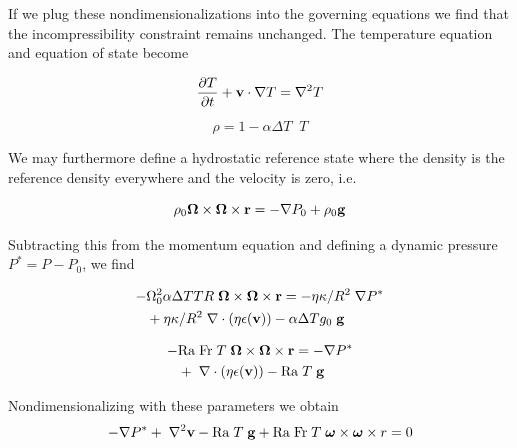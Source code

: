 \documentclass[extra,mreferee]{gji}
\begin{document}
If we plug these nondimensionalizations into the governing equations we find that the incompressibility constraint remains unchanged.  The temperature equation and equation of state become

\begin{equation}
\frac{\partial T}{\partial t} + {\bf v} \cdot \nabla T = \nabla^2 T
\end{equation}

\begin{equation}
\rho = 1 - \alpha \Delta T \;\;  T
\end{equation}

We may furthermore define a hydrostatic reference state where the density is the reference density everywhere and the velocity is zero, i.e.

\begin{equation}
 \rho_0{\bf \Omega \times \Omega \times r}= - \nabla P_0 + \rho_0 {\bf g}
\end{equation}

Subtracting this from the momentum equation and defining a dynamic pressure $P^* = P - P_0$, we find

\begin{equation}
\begin{aligned}
 - & \Omega_0^2  \alpha  \Delta T T R \; {\bf \Omega \times \Omega \times r} = - \eta \kappa / R^2 \; \nabla P^* \\ 
&+ \eta \kappa / R^2 \; \nabla \cdot \left( \eta \epsilon ({\bf v}) \right) - \alpha \Delta T g_0 \; {\bf g}
\end{aligned}
\end{equation}

\begin{equation}
\begin{aligned}
 - & \mathrm{Ra \; Fr}\; T \; {\bf \Omega \times \Omega \times r} = - \nabla P^* \\ 
&+ \; \nabla \cdot \left( \eta \epsilon ({\bf v}) \right) - \mathrm{Ra} \; T \; {\bf g}
\end{aligned}
\end{equation}

  
\fi

Nondimensionalizing with these parameters we obtain
\begin{equation}
\begin{aligned}
 - \nabla P^* + \; \nabla^2{\bf v} - \mathrm{Ra} \; T \; {\bf g} + \mathrm{Ra \; Fr}\; T \;{\mitbf{\omega} \times \mitbf{\omega} \times r} = 0
\end{aligned}
\end{equation}
\end{document}
